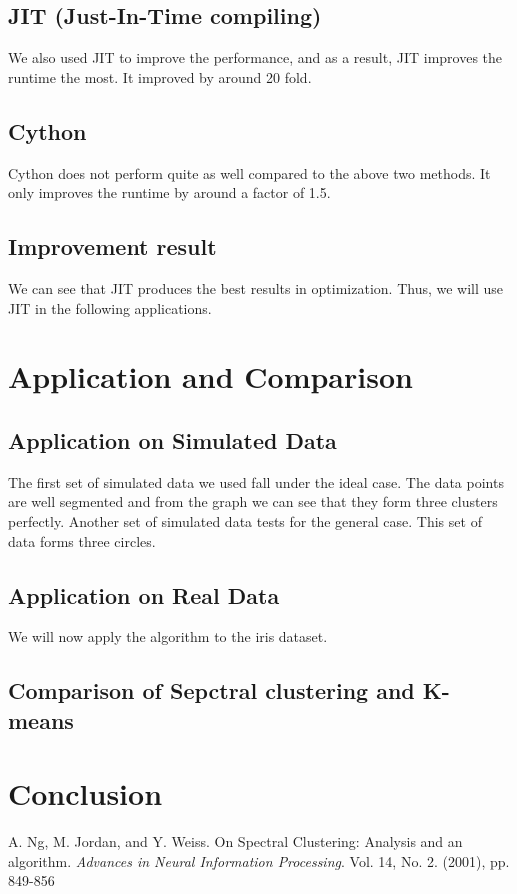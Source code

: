 \documentclass[11pt]{article}
\begin{document}
\subsection{JIT (Just-In-Time compiling) }
We also used JIT to improve the performance, and as a result, JIT improves the runtime the most. It improved by around 20 fold.
\subsection{Cython}
Cython does not perform quite as well compared to the above two methods. It only improves the runtime by around a factor of 1.5.

\subsection{Improvement result}
We can see that JIT produces the best results in optimization. Thus, we will use JIT in the following applications.

\section{Application and Comparison}
\subsection{Application on Simulated Data}
The first set of simulated data we used fall under the ideal case. The data points are well segmented and from the graph we can see that they form three clusters perfectly. Another set of simulated data tests for the general case. This set of data forms three circles.
\subsection{Application on Real Data}
We will now apply the algorithm to the iris dataset.
\subsection{Comparison of Sepctral clustering and K-means}



\section{Conclusion}

%
%


\newpage
\begin{thebibliography}{9}



A. Ng, M. Jordan, and Y. Weiss.
On Spectral Clustering: Analysis and an algorithm.
\textit{Advances in Neural Information Processing}.
Vol. 14, No. 2. (2001), pp. 849-856 

\end{thebibliography}
\end{document}

